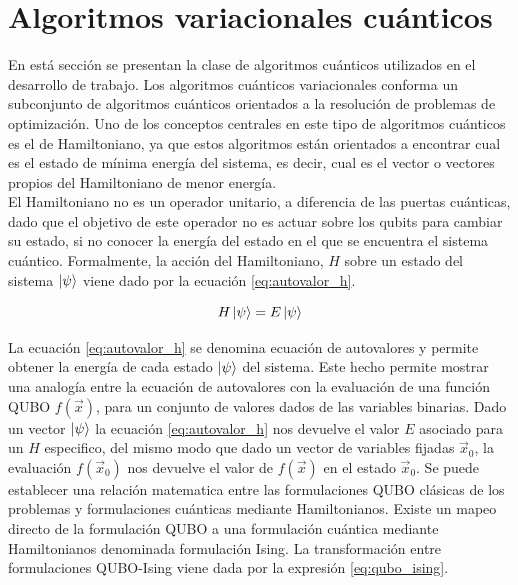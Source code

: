 \newpage


\section{Algoritmos variacionales cuánticos}

En está sección se presentan la clase de algoritmos cuánticos utilizados en el desarrollo de trabajo. Los algoritmos cuánticos variacionales \citep{cerezo} conforma un subconjunto de algoritmos cuánticos orientados a la resolución de problemas de optimización. Uno de los conceptos centrales en este tipo de algoritmos cuánticos es el de Hamiltoniano, ya que estos algoritmos están orientados a encontrar cual es el estado de mínima energía del sistema, es decir, cual es el vector o vectores propios del Hamiltoniano de menor energía. \\


El Hamiltoniano no es un operador unitario, a diferencia de las puertas cuánticas, dado que el objetivo de este operador no es actuar sobre los qubits para cambiar su estado, si no conocer la energía del estado en el que se encuentra el sistema cuántico. Formalmente, la acción del Hamiltoniano, $H$ sobre un estado del sistema $\ket{\psi}$ viene dado por la ecuación \ref{eq:autovalor_h}.

\begin{equation}
    H \ket{\psi} = E \ket{\psi}
    \label{eq:autovalor_h}
\end{equation}

La ecuación \ref{eq:autovalor_h} se denomina ecuación de autovalores y permite obtener la energía de cada estado $\ket{\psi}$ del sistema. Este hecho permite mostrar una analogía entre la ecuación de autovalores con la evaluación de una función \mbox{QUBO} $f(\Vec{x})$, para un conjunto de valores dados de las variables binarias. Dado un vector $\ket{\psi}$ la ecuación \ref{eq:autovalor_h} nos devuelve el valor $E$ asociado para un $H$ especifico, del mismo modo que dado un vector de variables fijadas $\Vec{x}_{0}$, la evaluación $f(\Vec{x}_0)$ nos devuelve el valor de $f(\Vec{x})$ en el estado $\Vec{x}_0$. Se puede establecer una relación matematica entre las formulaciones \mbox{QUBO} clásicas de los problemas y formulaciones cuánticas mediante Hamiltonianos. Existe un mapeo directo de la formulación \mbox{QUBO} a una formulación cuántica mediante Hamiltonianos denominada formulación Ising. La transformación entre formulaciones \mbox{QUBO}-Ising viene dada por la expresión \ref{eq:qubo_ising}.

